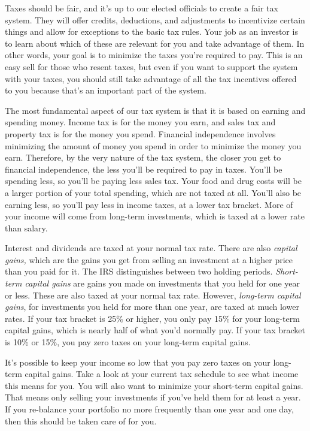 Taxes should be fair, and it's up to our elected officials to create a fair tax system. They will offer credits, deductions, and adjustments to incentivize certain things and allow for exceptions to the basic tax rules. Your job as an investor is to learn about which of these are relevant for you and take advantage of them. In other words, your goal is to minimize the taxes you're required to pay. This is an easy sell for those who resent taxes, but even if you want to support the system with your taxes, you should still take advantage of all the tax incentives offered to you because that's an important part of the system.

The most fundamental aspect of our tax system is that it is based on earning and spending money. Income tax is for the money you earn, and sales tax and property tax is for the money you spend. Financial independence involves minimizing the amount of money you spend in order to minimize the money you earn. Therefore, by the very nature of the tax system, the closer you get to financial independence, the less you'll be required to pay in taxes. You'll be spending less, so you'll be paying less sales tax. Your food and drug costs will be a larger portion of your total spending, which are not taxed at all. You'll also be earning less, so you'll pay less in income taxes, at a lower tax bracket. More of your income will come from long-term investments, which is taxed at a lower rate than salary.

Interest and dividends are taxed at your normal tax rate. There are also \emph{capital gains,} which are the gains you get from selling an investment at a higher price than you paid for it. The IRS distinguishes between two holding periods. \emph{Short-term capital gains} are gains you made on investments that you held for one year or less. These are also taxed at your normal tax rate. However, \emph{long-term capital gains}, for investments you held for more than one year, are taxed at much lower rates. If your tax bracket is 25\% or higher, you only pay 15\% for your long-term capital gains, which is nearly half of what you'd normally pay. If your tax bracket is 10\% or 15\%, you pay zero taxes on your long-term capital gains.

It's possible to keep your income so low that you pay zero taxes on your long-term capital gains. Take a look at your current tax schedule to see what income this means for you. You will also want to minimize your short-term capital gains. That means only selling your investments if you've held them for at least a year. If you re-balance your portfolio no more frequently than one year and one day, then this should be taken care of for you.

